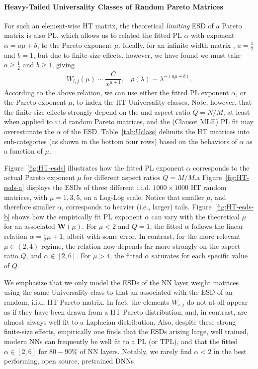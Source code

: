 \paragraph{Heavy-Tailed Universality Classes of Random Pareto Matrices}
For such an element-wise HT matrix, the theoretical \emph{limiting} ESD of a Pareto matrix is also PL,
which allows us to related the fitted PL $\alpha$ with exponent $\alpha=a\mu+b$, to the Pareto exponent $\mu$.
Ideally, for an infinite width matrix ,  $a=\tfrac{1}{2}$ and $b=1$, but due to finite-size effects, however,
we have found we must take $a\ge \tfrac{1}{2}$ and $b\ge 1$, giving
\begin{align}
W_{i,j}(\mu)\sim\dfrac{C}{x^{\mu +1}},\;\;\;\rho(\lambda)\sim\lambda^{-(a\mu+b)}.
\end{align}
According to the above relation, 
we can use either the fitted PL exponent $\alpha$, or the Pareto exponent $\mu$,
to index the HT Universality classes,
Note, however, that the finite-size effects strongly depend on  the and aspect ratio  $Q=N/M$,
at least when applied to i.i.d random Pareto matrices, and 
the (Clauset MLE) PL fit may overestimate the $\alpha$ of the ESD.
Table~\ref{tab:Uclass} delimits the HT matrices 
into sub-categories (as shown in the bottom four rows)  based on the behaviors of $\alpha$ as a function of $\mu$.

Figure~\ref{fig:HT-esds} illustrates how the fitted PL exponent $\alpha$ corresponds to the actual Pareto exponent $\mu$ 
for different aspect ratios $Q=M/M$.a
Figure~\ref{fig:HT-esds-a} displays the ESDs of three different i.i.d. $1000\times1000$ HT random matrices, with $\mu=1,3,5$, on a Log-Log scale.  
Notice that smaller $\mu$, and therefore smaller $\alpha$, corresponds to heavier (i.e., larger) tails.
Figure~\ref{fig:HT-esds-b} shows how the empirically fit PL exponent $\alpha$ can vary with the theoretical $\mu$ for an associated $\mathbf{W}(\mu)$.
For $\mu<2$ and $Q=1$, the fitted $\alpha$ follows the linear relation $\alpha=\frac{1}{2}\mu+1$,
albeit with some error.
In contrast, for the more relevant $\mu \in (2,4)$ regime, the relation now depends far more 
strongly on the aspect ratio $Q$, and $\alpha\in[2,6]$.
For $\mu>4$, the fitted $\alpha$ saturates for each specific value of $Q$.

We emphasize that we only model the ESDs of the NN layer weight matrices using the
same Universality class to that an associated with the ESD of an random, i.i.d, HT Pareto matrix.
In fact, the elements $W_{i,j}$ do not at all appear as if they have been
drawn from a HT Pareto distribution, and, in contrast, are almost always well fit to a Laplacian distribution.
Also, despite these strong finite-size effects, empirically one finds that the ESDs arising large, well trained,
modern NNs can frequently be well fit  to a PL (or TPL), and that the fitted $\alpha\in [2,6]$ for $80-90\%$
of NN layers.  Notably, we rarely find $\alpha<2$ in the best performing, open source, pretrained DNNs.

